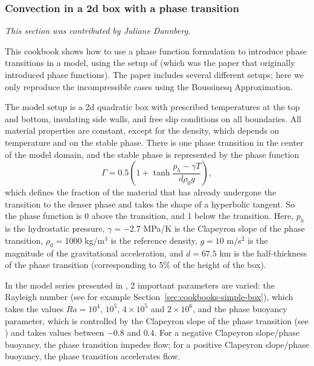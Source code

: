 \subsubsection{Convection in a 2d box with a phase transition}
\label{sec:cookbooks-phase-function}

\textit{This section was contributed by Juliane Dannberg.}

This cookbook shows how to use a phase function formulation to introduce phase transitions in a model, using the setup of \cite{CY85} (which was the paper that originally introduced phase functions). The paper includes several different setups; here we only reproduce the incompressible cases using the Boussinesq Approximation.  

The model setup is a 2d quadratic box with prescribed temperatures at the top and bottom, insulating side walls, and free slip conditions on all boundaries. All material properties are constant, except for the density, which depends on temperature and on the stable phase. There is one phase transition in the center of the model domain, and the stable phase is represented by the phase function
\begin{equation}
  \Gamma = 0.5 \left(1 + \tanh \frac{p_h - \gamma T}{d \rho_0 g} \right), 
\end{equation}
which defines the fraction of the material that has already undergone the transition to the denser phase and takes the shape of a hyperbolic tangent. So the phase function is 0 above the transition, and 1 below the transition. Here, $p_h$ is the hydrostatic pressure, $\gamma = -2.7$ MPa/K is the Clapeyron slope of the phase transition, $\rho_0 = 1000$ kg/m$^3$ is the reference density, $g = 10$ m/s$^2$ is the magnitude of the gravitational acceleration, and $d = 67.5$ km is the half-thickness of the phase transition (corresponding to 5\% of the height of the box). 

In the model series presented in \cite{CY85}, 2 important parameters are varied: the Rayleigh number (see for example Section~\ref{sec:cookbooks-simple-box}), which takes the values $Ra = 10^4$, $10^5$, $4 \times 10^5$ and $2 \times 10^6$, and the phase buoyancy parameter, which is controlled by the Clapeyron slope of the phase transition (see \cite{CY85}) and takes values between $-0.8$ and $0.4$. For a negative Clapeyron slope/phase buoyancy, the phase transition impedes flow; for a positive Clapeyron slope/phase buoyancy, the phase transition accelerates flow. 

